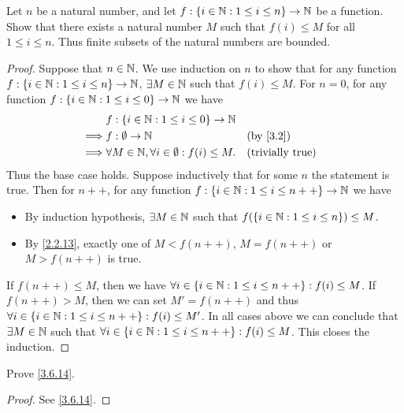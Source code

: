 \begin{ex}\label{ex:3.6.3}
  Let \(n\) be a natural number, and let \(f : \left\lbrace i \in \mathbb{N} : 1 \leq i \leq n\right\rbrace \to \mathbb{N}\) be a function.
  Show that there exists a natural number \(M\) such that \(f(i) \leq M\) for all \(1 \leq i \leq n\).
  Thus finite subsets of the natural numbers are bounded.
\end{ex}

\begin{proof}
  Suppose that \(n \in \mathbb{N}\).
  We use induction on \(n\) to show that for any function \(f : \left\lbrace i \in \mathbb{N} : 1 \leq i \leq n\right\rbrace \to \mathbb{N}\), \(\exists M \in \mathbb{N}\) such that \(f(i) \leq M\).
  For \(n = 0\), for any function \(f : \left\lbrace i \in \mathbb{N} : 1 \leq i \leq 0\right\rbrace \to \mathbb{N}\) we have
  \begin{align*}
             & f : \set{i \in \N : 1 \leq i \leq 0} \to \N                                           \\
    \implies & f : \emptyset \to \N                                     &  & \text{(by \cref{3.2})}  \\
    \implies & \forall M \in \N, \forall i \in \emptyset : f(i) \leq M. &  & \text{(trivially true)} \\
  \end{align*}
  Thus the base case holds.
  Suppose inductively that for some \(n\) the statement is true.
  Then for \(n++\), for any function \(f : \left\lbrace i \in \mathbb{N} : 1 \leq i \leq n++\right\rbrace \to \mathbb{N}\) we have
  \begin{itemize}
    \item By induction hypothesis, \(\exists M \in \mathbb{N}\) such that \(f(\left\lbrace i \in \mathbb{N} : 1 \leq i \leq n\right\rbrace) \leq M\).
    \item By \cref{2.2.13}, exactly one of \(M < f(n++)\), \(M = f(n++)\) or \(M > f(n++)\) is true.
  \end{itemize}
  If \(f(n++) \leq M\), then we have \(\forall i \in \left\lbrace i \in \mathbb{N} : 1 \leq i \leq n++\right\rbrace : f(i) \leq M\).
  If \(f(n++) > M\), then we can set \(M' = f(n++)\) and thus \(\forall i \in \left\lbrace i \in \mathbb{N} : 1 \leq i \leq n++\right\rbrace : f(i) \leq M'\).
  In all cases above we can conclude that \(\exists M \in \mathbb{N}\) such that \(\forall i \in \left\lbrace i \in \mathbb{N} : 1 \leq i \leq n++\right\rbrace : f(i) \leq M\).
  This closes the induction.
\end{proof}

\begin{ex}\label{ex:3.6.4}
  Prove \cref{3.6.14}.
\end{ex}

\begin{proof}
  See \cref{3.6.14}.
\end{proof}

